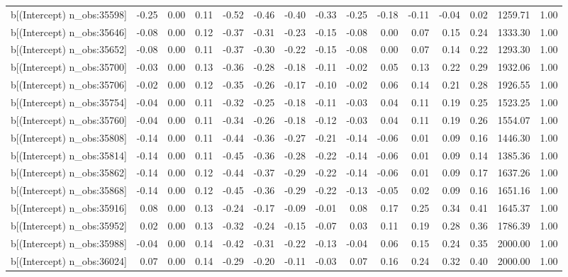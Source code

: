 \begin{table}[ht]
\begin{tabular}{rrrrrrrrrrrrrrr}
  b[(Intercept) n\_obs:35598] & -0.25 & 0.00 & 0.11 & -0.52 & -0.46 & -0.40 & -0.33 & -0.25 & -0.18 & -0.11 & -0.04 & 0.02 & 1259.71 & 1.00 \\ 
  b[(Intercept) n\_obs:35646] & -0.08 & 0.00 & 0.12 & -0.37 & -0.31 & -0.23 & -0.15 & -0.08 & 0.00 & 0.07 & 0.15 & 0.24 & 1333.30 & 1.00 \\ 
  b[(Intercept) n\_obs:35652] & -0.08 & 0.00 & 0.11 & -0.37 & -0.30 & -0.22 & -0.15 & -0.08 & 0.00 & 0.07 & 0.14 & 0.22 & 1293.30 & 1.00 \\ 
  b[(Intercept) n\_obs:35700] & -0.03 & 0.00 & 0.13 & -0.36 & -0.28 & -0.18 & -0.11 & -0.02 & 0.05 & 0.13 & 0.22 & 0.29 & 1932.06 & 1.00 \\ 
  b[(Intercept) n\_obs:35706] & -0.02 & 0.00 & 0.12 & -0.35 & -0.26 & -0.17 & -0.10 & -0.02 & 0.06 & 0.14 & 0.21 & 0.28 & 1926.55 & 1.00 \\ 
  b[(Intercept) n\_obs:35754] & -0.04 & 0.00 & 0.11 & -0.32 & -0.25 & -0.18 & -0.11 & -0.03 & 0.04 & 0.11 & 0.19 & 0.25 & 1523.25 & 1.00 \\ 
  b[(Intercept) n\_obs:35760] & -0.04 & 0.00 & 0.11 & -0.34 & -0.26 & -0.18 & -0.12 & -0.03 & 0.04 & 0.11 & 0.19 & 0.26 & 1554.07 & 1.00 \\ 
  b[(Intercept) n\_obs:35808] & -0.14 & 0.00 & 0.11 & -0.44 & -0.36 & -0.27 & -0.21 & -0.14 & -0.06 & 0.01 & 0.09 & 0.16 & 1446.30 & 1.00 \\ 
  b[(Intercept) n\_obs:35814] & -0.14 & 0.00 & 0.11 & -0.45 & -0.36 & -0.28 & -0.22 & -0.14 & -0.06 & 0.01 & 0.09 & 0.14 & 1385.36 & 1.00 \\ 
  b[(Intercept) n\_obs:35862] & -0.14 & 0.00 & 0.12 & -0.44 & -0.37 & -0.29 & -0.22 & -0.14 & -0.06 & 0.01 & 0.09 & 0.17 & 1637.26 & 1.00 \\ 
  b[(Intercept) n\_obs:35868] & -0.14 & 0.00 & 0.12 & -0.45 & -0.36 & -0.29 & -0.22 & -0.13 & -0.05 & 0.02 & 0.09 & 0.16 & 1651.16 & 1.00 \\ 
  b[(Intercept) n\_obs:35916] & 0.08 & 0.00 & 0.13 & -0.24 & -0.17 & -0.09 & -0.01 & 0.08 & 0.17 & 0.25 & 0.34 & 0.41 & 1645.37 & 1.00 \\ 
  b[(Intercept) n\_obs:35952] & 0.02 & 0.00 & 0.13 & -0.32 & -0.24 & -0.15 & -0.07 & 0.03 & 0.11 & 0.19 & 0.28 & 0.36 & 1786.39 & 1.00 \\ 
  b[(Intercept) n\_obs:35988] & -0.04 & 0.00 & 0.14 & -0.42 & -0.31 & -0.22 & -0.13 & -0.04 & 0.06 & 0.15 & 0.24 & 0.35 & 2000.00 & 1.00 \\ 
  b[(Intercept) n\_obs:36024] & 0.07 & 0.00 & 0.14 & -0.29 & -0.20 & -0.11 & -0.03 & 0.07 & 0.16 & 0.24 & 0.32 & 0.40 & 2000.00 & 1.00 \\ 

\end{tabular}
\end{table}
